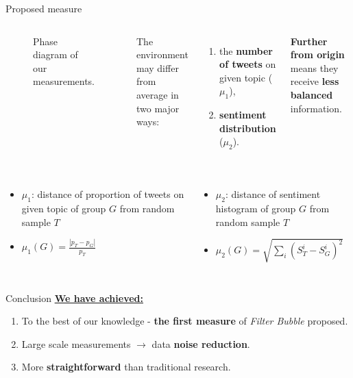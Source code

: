 \documentclass{beamer}
\begin{document}
\begin{frame}[fragile]
\begin{columns}[T]
\begin{column}{.63\textwidth}
\begin{block}{Proposed measure}
\begin{columns}
\begin{figure}
                \caption*{Phase diagram of our measurements.}
            \end{figure}
            The environment may differ from average in two major ways:
            \vspace{1cm}
            \begin{enumerate}
                \item the \textbf{number of tweets} on given topic ($\mu_1$),
                \item \textbf{sentiment distribution} ($\mu_2$).
            \end{enumerate}
            \vspace{1cm}
            \textbf{Further from origin} means they receive \textbf{less balanced} information.
    \end{columns}
    \begin{columns}
            \begin{itemize}
                \item $\mu_1$: distance of proportion of tweets on given topic of group $G$ from random sample $T$
                \item $\mu_1(G) = \frac{|p_T - p_G|}{p_T}$
            \end{itemize}
            \begin{itemize}
                \item $\mu_2$: distance of sentiment histogram of group $G$ from random sample $T$
                \item $\mu_2(G) = \sqrt{\sum_{i}{\left(S_T^i - S_G^i\right)^2}}$
            \end{itemize}
    \end{columns}
\end{block}
\vspace{-1.5cm}
\begin{customalertblock}{Conclusion}
    \vspace{-1cm}
    \underline{\textbf{We have achieved:}}
    \vspace{1cm}
    \begin{enumerate}
        \item To the best of our knowledge - \textbf{the first measure} of \textit{Filter Bubble} proposed.
        \item Large scale measurements $\rightarrow$ data \textbf{noise reduction}.
        \item More \textbf{straightforward} than traditional research.

\end{enumerate}
\end{customalertblock}
\end{column}
\end{columns}
\end{frame}
\end{document}
